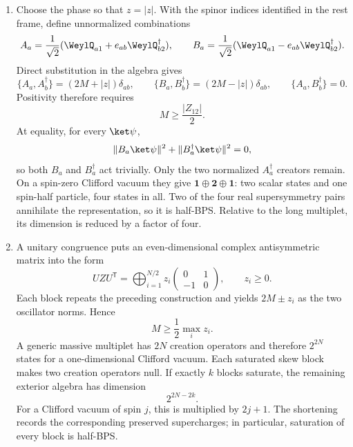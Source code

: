 \begin{enumerate}
\begin{enumerate}
    \item Choose the phase so that \(z=|z|\).  With the spinor indices
      identified in the rest frame, define unnormalized combinations
      \[
        A_a=\frac1{\sqrt2}
          (\WeylQ_{a1}+e_{ab}\WeylQ_{b2}^\dagger),
        \qquad
        B_a=\frac1{\sqrt2}
          (\WeylQ_{a1}-e_{ab}\WeylQ_{b2}^\dagger).
      \]
      Direct substitution in the algebra gives
      \[
        \{A_a,A_b^\dagger\}=(2M+|z|)\delta_{ab},
        \qquad
        \{B_a,B_b^\dagger\}=(2M-|z|)\delta_{ab},
        \qquad \{A_a,B_b^\dagger\}=0.
      \]
      Positivity therefore requires
      \[
        M\geq\frac{|Z_{12}|}{2}.
      \]
      At equality, for every \(\ket\psi\),
      \[
        \lVert B_a\ket\psi\rVert^2
          +\lVert B_a^\dagger\ket\psi\rVert^2=0,
      \]
      so both \(B_a\) and \(B_a^\dagger\) act trivially.  Only the two
      normalized \(A_a^\dagger\) creators remain.  On a spin-zero Clifford
      vacuum they give
      \(\mathbf1\oplus\mathbf2\oplus\mathbf1\): two scalar states and one
      spin-half particle, four states in all.  Two of the four real
      supersymmetry pairs annihilate the representation, so it is
      half-BPS.  Relative to the long multiplet, its dimension is reduced by
      a factor of four.

    \item A unitary congruence puts an even-dimensional complex
      antisymmetric matrix into the form
      \[
        UZU^{\mathsf T}
          =\bigoplus_{i=1}^{N/2}
            z_i\begin{pmatrix}0&1\\-1&0\end{pmatrix},
        \qquad z_i\geq0.
      \]
      Each block repeats the preceding construction and yields
      \(2M\pm z_i\) as the two oscillator norms.  Hence
      \[
        M\geq\frac12\max_i z_i.
      \]
      A generic massive multiplet has \(2N\) creation operators and therefore
      \(2^{2N}\) states for a one-dimensional Clifford vacuum.  Each
      saturated skew block makes two creation operators null.  If exactly
      \(k\) blocks saturate, the remaining exterior algebra has dimension
      \[
        2^{2N-2k}.
      \]
      For a Clifford vacuum of spin \(j\), this is multiplied by
      \(2j+1\).  The shortening records the corresponding preserved
      supercharges; in particular, saturation of every block is half-BPS.
  \end{enumerate}


\end{enumerate}

